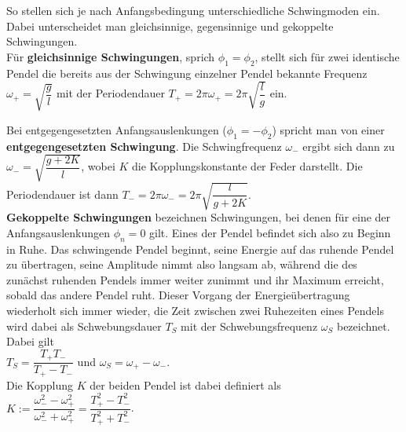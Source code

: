 So stellen sich je nach Anfangsbedingung unterschiedliche Schwingmoden ein. Dabei unterscheidet man gleichsinnige, gegensinnige und gekoppelte Schwingungen. \\

Für \textbf{gleichsinnige Schwingungen}, sprich $\phi_1=\phi_2$, stellt sich für zwei identische Pendel die bereits aus der Schwingung einzelner Pendel bekannte Frequenz \\ 
$\omega_+=\sqrt{\dfrac{g}{l}}$ mit der Periodendauer $T_+ = 2\pi \omega_+ = 2\pi \sqrt{\dfrac{l}{g}}$ ein.
\newpage

\noindent Bei entgegengesetzten Anfangsauslenkungen ($\phi_1=-\phi_2$) spricht man von einer \\ 
\textbf{entgegengesetzten Schwingung}. Die Schwingfrequenz $\omega_-$ ergibt sich dann zu \\
$\omega_- = \sqrt{\dfrac{g+2K}{l}}$, wobei $K$ die Kopplungskonstante der Feder darstellt.
Die Periodendauer ist dann $T_- = 2 \pi \omega_- = 2 \pi \sqrt{\dfrac{l}{g+2K}}$. \\

\textbf{Gekoppelte Schwingungen} bezeichnen Schwingungen, bei denen für eine der Anfangsauslenkungen $\phi_n = 0$ gilt. Eines der Pendel befindet sich also zu Beginn in Ruhe.
Das schwingende Pendel beginnt, seine Energie auf das ruhende Pendel zu übertragen, seine Amplitude nimmt also langsam ab, während die des zunächst ruhenden Pendels immer weiter zunimmt und ihr Maximum erreicht, sobald das andere Pendel ruht.
Dieser Vorgang der Energieübertragung wiederholt sich immer wieder, die Zeit zwischen zwei Ruhezeiten eines Pendels wird dabei als Schwebungsdauer $T_S$ mit der Schwebungsfrequenz $\omega_S$ bezeichnet. \\
Dabei gilt \\

\noindent $T_S = \dfrac{T_+ T_-}{T_+ - T_-}$ und $\omega_S= \omega_+ -\omega_-$. \\

\noindent Die Kopplung $K$ der beiden Pendel ist dabei definiert als \\

\noindent $K := \dfrac{\omega_-^2-\omega_+^2}{\omega_-^2 + \omega_+^2} = \dfrac{T_+^2 - T_-^2}{T_+^2 + T_-^2}$.



